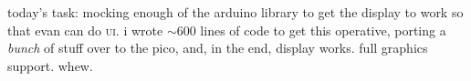 today's task: mocking enough of the arduino library to get the display to work
so that evan can do \textsc{ui}. i wrote \(\sim\)600 lines of code to get this
operative, porting a \emph{bunch} of stuff over to the pico, and, in the end,
display works. full graphics support. whew.
